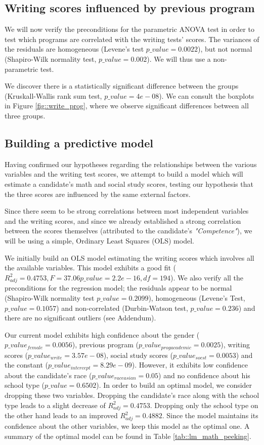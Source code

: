\documentclass[10pt]{article}
\begin{document}
	
	\subsection{Writing scores influenced by previous program}
	We will now verify the preconditions for the parametric ANOVA test in order to test which programs are correlated with the writing tests' scores. The variances of the residuals are homogeneous (Levene's test $p\_value = 0.0022$), but not normal (Shapiro-Wilk normality test, $p\_value = 0.002$). We will thus use a non-parametric test.
	
	We discover there is a statistically significant difference between the groups (Kruskall-Wallis rank sum test, $p\_value=4e-08$). We can consult the boxplots in Figure \ref{fig::write_prog}, where we observe significant differences between all three groups.
	
	
	\subsection{Building a predictive model}
	Having confirmed our hypotheses regarding the relationships between the various variables and the writing test scores, we attempt to build a model which will estimate a candidate's math and social study scores, testing our hypothesis that the three scores are influenced by the same external factors. 
	
	Since there seem to be strong correlations between most independent variables and the writing scores, and since we already established a strong correlation between the scores themselves (attributed to the candidate's \textit{"Competence"}), we will be using a simple, Ordinary Least Squares (OLS) model.
	
	We initially build an OLS model estimating the writing scores which involves all the available variables. This model exhibits a good fit ($R^2_{adj} = 0.4753, F= 37.06 p\_value=2.2e-16, df=194$). We also verify all the preconditions for the regression model; the residuals appear to be normal (Shapiro-Wilk normality test $p\_value = 0.2099$), homogeneous (Levene's Test, $p\_value = 0.1057$) and non-correlated (Durbin-Watson test, $p\_value=0.236$) and there are no significant outliers (see Addendum).
	
	Our current model exhibits high confidence about the gender ($p\_value_{female} = 0.0056$), previous program  ($p\_value_{progacademic} = 0.0025$), writing scores ($p\_value_{write} = 3.57e-08$), social study scores ($p\_value_{socst} = 0.0053$) and the constant ($p\_value_{intercept} = 8.29e-09$). However, it exhibits low confidence about the candidate's race ($p\_value_{raceasian} = 0.05$) and no confidence about his school type ($p\_value=0.6502$). In order to build an optimal model, we consider dropping these two variables. Dropping the candidate's race along with the school type leads to a slight decrease of $R^2_{adj} = 0.4753$. Dropping only the school type on the other hand leads to an improved $R^2_{adj} = 0.4882$. Since the model maintains its confidence about the other variables, we keep this model as the optimal one. A summary of the optimal model can be found in Table \ref{tab::lm_math_peeking}.
	
\end{document}
